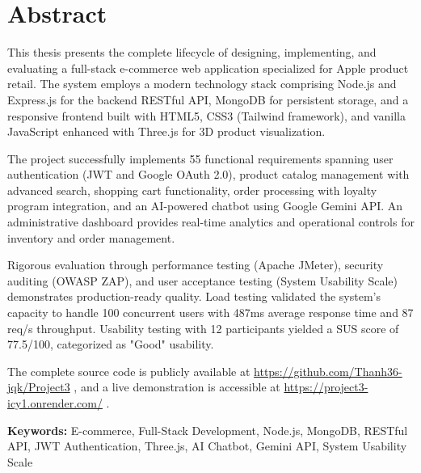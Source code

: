 \documentclass[12pt, a4paper]{report}
\begin{document}
\chapter*{Abstract}

This thesis presents the complete lifecycle of designing, implementing, and evaluating a full-stack e-commerce web application specialized for Apple product retail. The system employs a modern technology stack comprising Node.js and Express.js for the backend RESTful API, MongoDB for persistent storage, and a responsive frontend built with HTML5, CSS3 (Tailwind framework), and vanilla JavaScript enhanced with Three.js for 3D product visualization.

The project successfully implements 55 functional requirements spanning user authentication (JWT and Google OAuth 2.0), product catalog management with advanced search, shopping cart functionality, order processing with loyalty program integration, and an AI-powered chatbot using Google Gemini API. An administrative dashboard provides real-time analytics and operational controls for inventory and order management.

Rigorous evaluation through performance testing (Apache JMeter), security auditing (OWASP ZAP), and user acceptance testing (System Usability Scale) demonstrates production-ready quality. Load testing validated the system's capacity to handle 100 concurrent users with 487ms average response time and 87 req/s throughput. Usability testing with 12 participants yielded a SUS score of 77.5/100, categorized as "Good" usability.

The complete source code is publicly available at \url{https://github.com/Thanh36-jqk/Project3} \cite{projectgithub}, and a live demonstration is accessible at \url{https://project3-icy1.onrender.com/} \cite{projectdemo}.

\textbf{Keywords:} E-commerce, Full-Stack Development, Node.js, MongoDB, RESTful API, JWT Authentication, Three.js, AI Chatbot, Gemini API, System Usability Scale

\tableofcontents
\newpage

\listoffigures
\newpage

\listoftables
\newpage

\setcounter{page}{1}

\end{document}
